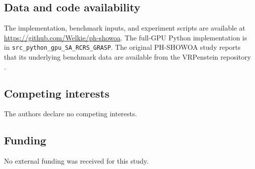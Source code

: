 \documentclass[pdflatex,sn-mathphys-num]{sn-jnl}
\begin{document}
\subsection*{Data and code availability}
The implementation, benchmark inputs, and experiment scripts are available at \url{https://github.com/Welkie/ph-showoa}. The full-GPU Python implementation is in \texttt{src\_python\_gpu\_SA\_RCRS\_GRASP}. The original PH-SHOWOA study reports that its underlying benchmark data are available from the VRPenstein repository \cite{nguyen2026phshowoa}.
\subsection*{Competing interests}
The authors declare no competing interests.
\subsection*{Funding}
No external funding was received for this study.


\end{document}
